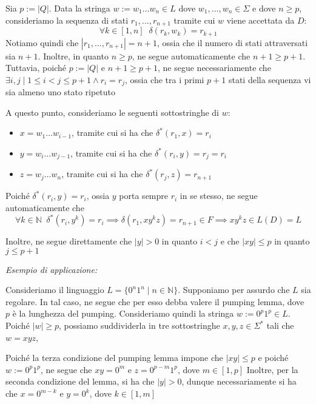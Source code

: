 \documentclass[12pt,a4paper]{report}
\theoremstyle{definition}
\newcommand{\abs}[1]{\left|#1\right|}
\newcommand{\N}{\mathbb{N}}
\begin{document}
        Sia $p:= \abs{Q}$. Data la stringa $w := w_1 \ldots w_n \in L$ dove $w_1, \ldots, w_n \in \Sigma$ e dove $n \geq p$, consideriamo la sequenza di stati $r_1,\ldots, r_{n+1}$ tramite cui $w$ viene accettata da $D$:
        \[\forall k \in [1,n] \;\; \delta(r_k,w_k) = r_{k+1}\]
        Notiamo quindi che $\abs{r_1, \ldots, r_{n+1}} = n+1$, ossia che il numero di stati attraversati sia $n+1$. Inoltre, in quanto $n \geq p$, ne segue automaticamente che $n+1 \geq p+1$. Tuttavia, poiché $p := \abs{Q}$ e $n+1 \geq p+1$, ne segue necessariamente che $\exists i, j \mid 1 \leq i < j \leq p+1 \land r_i = r_j$, ossia che tra i primi $p+1$ stati della sequenza vi sia almeno uno stato ripetuto
        
        A questo punto, consideriamo le seguenti sottostringhe di $w$:
        \begin{itemize}
            \item $x = w_1 \ldots w_{i-1}$, tramite cui si ha che $\delta^*(r_1, x) = r_i$
            \item $y = w_i \ldots w_{j-1}$, tramite cui si ha che $\delta^*(r_i, y) = r_j = r_i$
            \item $z = w_j \ldots w_{n}$, tramite cui si ha che $\delta^*(r_j, z) = r_{n+1}$
        \end{itemize}
        
        Poiché $\delta^*(r_i, y) = r_i$, ossia $y$ porta sempre $r_i$ in se stesso, ne segue automaticamente che
        \[\forall k \in \N \;\; \delta^*(r_i, y^k) = r_i \implies \delta(r_1, xy^kz) = r_{n+1} \in F \implies xy^kz \in L(D) = L\]
        
        Inoltre, ne segue direttamente che $\abs{y} > 0$ in quanto $i < j$ e che $\abs{xy} \leq p$ in quanto $j \leq p+1$


        \textit{Esempio di applicazione:}


        Consideriamo il linguaggio $L = \{0^n1^n \mid n \in \N\}$. Supponiamo per assurdo che $L$ sia regolare. In tal caso, ne segue che per esso debba valere il pumping lemma, dove $p$ è la lunghezza del pumping. Consideriamo quindi la stringa $w := 0^p1^p \in L$. Poiché $\abs{w} \geq p$, possiamo suddividerla in tre sottostringhe $x,y,z \in \Sigma^*$ tali che $w = xyz$, 

        Poiché la terza condizione del pumping lemma impone che $\abs{xy} \leq p$ e poiché $w := 0^p1^p$, ne segue che $xy = 0^m$ e $z = 0^{p-m}1^{p}$, dove $m \in [1,p]$
        Inoltre, per la seconda condizione del lemma, si ha che $\abs{y} > 0$, dunque necessariamente si ha che $x = 0^{m-k}$ e $y = 0^k$, dove $k \in [1,m]$
        
\end{document}
